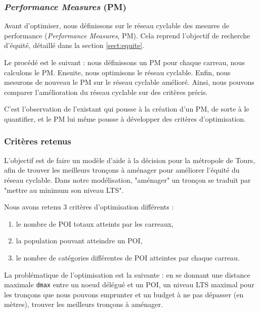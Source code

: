 \subsubsection{\emph{Performance Measures} (PM)}

Avant d'optimiser, nous définissons sur le réseau cyclable des mesures de performance (\emph{Performance Measures}, PM). Cela reprend l'objectif de recherche d'équité, détaillé dans la section \ref{sect:equite}. 

Le procédé est le suivant : nous définissons un PM pour chaque carreau, nous calculons le PM. Ensuite, nous optimisons le réseau cyclable. Enfin, nous mesurons de nouveau le PM sur le réseau cyclable amélioré. Ainsi, nous pouvons comparer l'amélioration du réseau cyclable sur des critères précis.

C'est l'observation de l'existant qui pousse à la création d'un PM, de sorte à le quantifier, et le PM lui même pousse à développer des critères d'optimisation.




\subsubsection{Critères retenus}


L'objectif est de faire un modèle d'aide à la décision pour la métropole de Tours, afin de trouver les meilleurs tronçons à aménager pour améliorer l'équité du réseau cyclable. Dans notre modélisation, "aménager" un tronçon se traduit par "mettre au minimum son niveau LTS".

Nous avons retenu 3 critères d'optimisation différents :

\begin{enumerate} \label{criteresopti}
    \item le nombre de POI totaux atteints par les carreaux, \label{criterepoi}
    \item la population pouvant atteindre un POI, \label{criterepopu}
    \item le nombre de catégories différentes de POI atteintes par chaque carreau. \label{criterecat}
\end{enumerate}

La problématique de l'optimisation est la suivante : en se donnant une distance maximale \verb|dmax| entre un noeud délégué et un POI, un niveau LTS maximal pour les tronçons que nous pouvons emprunter et un budget à ne pas dépasser (en mètres), trouver les meilleurs tronçons à aménager.

